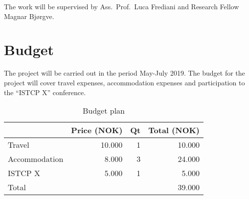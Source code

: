 \documentclass[12pt]{article}
\begin{document}
The work will be supervised by Ass.~Prof.~Luca Frediani and Research Fellow
Magnar Bj\o rgve.

\section{Budget}

The project will be carried out in the period May-July 2019. 
The budget for the project will cover travel expenses, accommodation
expenses and participation to the ``ISTCP X'' conference.

\begin{table}[!htb]
  \begin{tabular}{l|r|r|r}
               & Price (NOK) & Qt & Total (NOK)\\
\hline
    Travel        & 10.000      & 1  & 10.000     \\
    Accommodation &  8.000      & 3  & 24.000     \\
    ISTCP X       &  5.000      & 1  &  5.000     \\
\hline
    Total         &             &    & 39.000     \\
  \end{tabular}
  \caption{Budget plan}
  \label{tab:budget}
\end{table}



\end{document}
